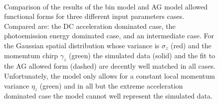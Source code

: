 \begin{figure}
  \centerline {
    \subfloat[][]{
      \label{fig:bin_model_acc}
      \begin{tikzpicture}
        
      \end{tikzpicture}
    }
    \subfloat[][]{
      \label{fig:bin_model_vmax}
      \begin{tikzpicture}
        
      \end{tikzpicture}
    }
    \\
  }
  \centerline{
    \subfloat[][]{
      \label{fig:bin_model_equal}
      \begin{tikzpicture}
        
      \end{tikzpicture}
    }
  }
  \caption[Results of bin model for computing initial conditions]{
    Comparison of the results of the bin model and AG model allowed functional forms for three different input parameters cases.
    Compared are:  the DC acceleration dominated case,  the photoemission energy dominated case, and  an intermediate case.
    For the Gaussian spatial distribution whose variance is $\sigma_z$ (red) and the momemtum chirp $\gamma_z$ (green) the simulated data (solid) and the fit to the AG allowed form (dashed) are decently well matched in all cases.
    Unfortunately, the model only allows for a constant local momentum variance $\eta_z$ (green) and in all but the extreme acceleration dominated case  the model cannot well represent the simulated data.
  }
  \label{fig:bin_model}
\end{figure}
